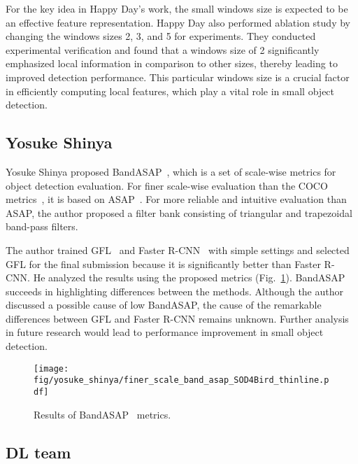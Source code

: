 \documentclass{mva_style}
\begin{document}
For the key idea in Happy Day's work, the small windows size is expected to be an effective feature representation. Happy Day also performed ablation study by changing the windows sizes 2, 3, and 5 for experiments. They conducted experimental verification and found that a windows size of 2 significantly emphasized local information in comparison to other sizes, thereby leading to improved detection performance. This particular windows size is a crucial factor in efficiently computing local features, which play a vital role in small object detection.




\subsection{Yosuke Shinya}

Yosuke Shinya proposed BandASAP~\cite{BandRe_MVAW2023}, which is a set of scale-wise metrics for object detection evaluation.
For finer scale-wise evaluation than the COCO metrics~\cite{COCO_ECCV2014, cocoapi},
it is based on ASAP~\cite{USB_Shinya_BMVC2022}.
For more reliable and intuitive evaluation than ASAP,
the author proposed a filter bank consisting of triangular and trapezoidal band-pass filters.

The author trained GFL~\cite{GFL_NeurIPS2020} and Faster R-CNN~\cite{Faster_R-CNN_NIPS2015} with simple settings
and selected GFL for the final submission because it is significantly better than Faster R-CNN.
He analyzed the results using the proposed metrics (Fig.~\ref{fig:band_asap_sod4bird}).
BandASAP succeeds in highlighting differences between the methods.
Although the author discussed a possible cause of low BandASAP, the cause of the remarkable differences between GFL and Faster R-CNN remains unknown.
Further analysis in future research would lead to performance improvement in small object detection.

\begin{figure}[t]
  \centering
  \texttt{[image: fig/yosuke\_shinya/finer\_scale\_band\_asap\_SOD4Bird\_thinline.pdf]}
  \caption{
    Results of BandASAP~\cite{BandRe_MVAW2023} metrics.
  }
  \label{fig:band_asap_sod4bird}
  \vspace{-1.5em}
\end{figure}

\subsection{DL team}
\end{document}
